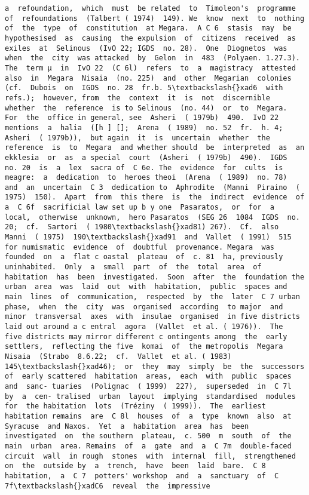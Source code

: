 \documentclass[11pt]{article}
\begin{document}
\begin{Verbatim}[commandchars=\\\{\}]
a  refoundation,  which  must  be related  to  Timoleon's  programme  of  refoundations  (Talbert ( 1974)  149). We  know  next  to  nothing  of  the  type  of  constitution  at Megara.  A C 6  stasis  may  be  hypothesised  as  causing  the expulsion  of  citizens  received  as  exiles  at  Selinous  (IvO 22; IGDS  no. 28).  One  Diognetos  was  when  the  city  was attacked  by  Gelon  in  483  (Polyaen. 1.27.3).  The  term µ  in  IvO 22  (C 6l)  refers  to  a  magistracy  attested also  in  Megara  Nisaia  (no. 225)  and  other  Megarian  colonies (cf.  Dubois  on  IGDS  no. 28  fr.b. 5\textbackslash{}xad6  with  refs.);  however, from  the  context  it  is  not  discernible  whether  the  reference  is to Selinous  (no. 44)  or  to  Megara.  For  the  office in general, see  Asheri  ( 1979b)  490.  IvO 22  mentions  a  halia  ([h ] [];  Arena  ( 1989)  no. 52  fr.  h. 4;  Asheri  ( 1979b)),  but again  it  is  uncertain  whether  the  reference  is  to  Megara  and whether should  be  interpreted  as  an  ekklesia  or  as  a special  court  (Asheri  ( 1979b)  490).  IGDS  no. 20  is  a  lex  sacra of  C 6e. The  evidence  for  cults  is  meagre:  a  dedication  to  heroes theoi  (Arena  ( 1989)  no. 78)  and  an  uncertain  C 3  dedication to  Aphrodite  (Manni  Piraino  ( 1975)  150).  Apart  from  this there  is  the  indirect  evidence  of  a  C 6f  sacrificial law set up b y one  Pasaratos,  or  for  a  local,  otherwise  unknown,  hero Pasaratos  (SEG 26  1084  IGDS  no. 20;  cf.  Sartori  ( 1980\textbackslash{}xad81) 267).  Cf.  also  Manni  ( 1975)  190\textbackslash{}xad91  and  Vallet  ( 1991)  515  for numismatic  evidence  of  doubtful  provenance. Megara  was  founded  on  a  flat c oastal  plateau  of  c. 81  ha, previously  uninhabited.  Only  a  small  part  of  the  total  area  of habitation  has  been  investigated.  Soon  after  the  foundation the  urban  area  was  laid  out  with  habitation,  public  spaces and  main  lines  of  communication,  respected  by  the  later  C 7 urban  phase,  when  the  city  was  organised  according  to major  and  minor  transversal  axes  with  insulae  organised  in five districts laid out around a c entral  agora  (Vallet  et al. ( 1976)).  The  five districts may mirror different c ontingents among  the  early  settlers,  reflecting the five  komai  of  the metropolis  Megara  Nisaia  (Strabo  8.6.22;  cf.  Vallet  et al. ( 1983)  145\textbackslash{}xad46);  or  they  may  simply  be  the  successors  of  early scattered  habitation  areas,  each  with  public  spaces  and  sanc- tuaries  (Polignac  ( 1999)  227),  superseded  in  C 7l  by  a  cen- tralised  urban  layout  implying  standardised  modules  for  the habitation  lots  (Tréziny  ( 1999)).  The  earliest  habitation remains  are  C 8l  houses  of  a  type  known  also  at  Syracuse  and Naxos.  Yet  a  habitation  area  has  been  investigated  on  the southern  plateau,  c. 500  m  south  of  the  main  urban  area. Remains  of  a  gate  and  a  C 7m  double-faced  circuit  wall  in rough  stones  with  internal  fill,  strengthened  on  the  outside by  a  trench,  have  been  laid  bare.  C 8  habitation,  a  C 7  potters' workshop  and  a  sanctuary  of  C 7f\textbackslash{}xadC6  reveal  the  impressive 
\end{Verbatim}
\end{document}
